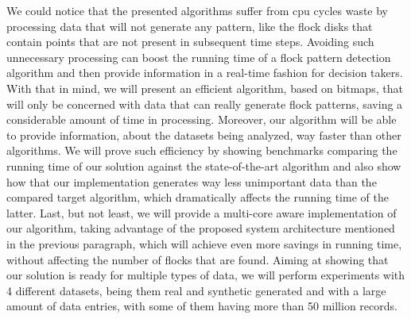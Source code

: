 We could notice that the presented algorithms suffer from \ac{cpu} cycles waste by processing data that will not
generate any pattern, like the flock disks that contain points that are not present in subsequent time steps. Avoiding
such unnecessary processing can boost the running time of a flock pattern detection algorithm and then provide
information in a real-time fashion for decision takers. With that in mind, we will present an efficient algorithm, based
on bitmaps, that will only be concerned with data that can really generate flock patterns, saving a considerable amount
of time in processing. Moreover, our algorithm will be able to provide information, about the datasets being analyzed,
way faster than other algorithms. We will prove such efficiency by showing benchmarks comparing the running time of our
solution against the state-of-the-art algorithm and also show how that our implementation generates way less unimportant
data than the compared target algorithm, which dramatically affects the running time of the latter. Last, but not least,
we will provide a multi-core aware implementation of our algorithm, taking advantage of the proposed system architecture
mentioned in the previous paragraph, which will achieve even more savings in running time, without affecting the number
of flocks that are found.  Aiming at showing that our solution is ready for multiple types of data, we will perform
experiments with 4 different datasets, being them real and synthetic generated and with a large amount of data entries,
with some of them having more than 50 million records.
